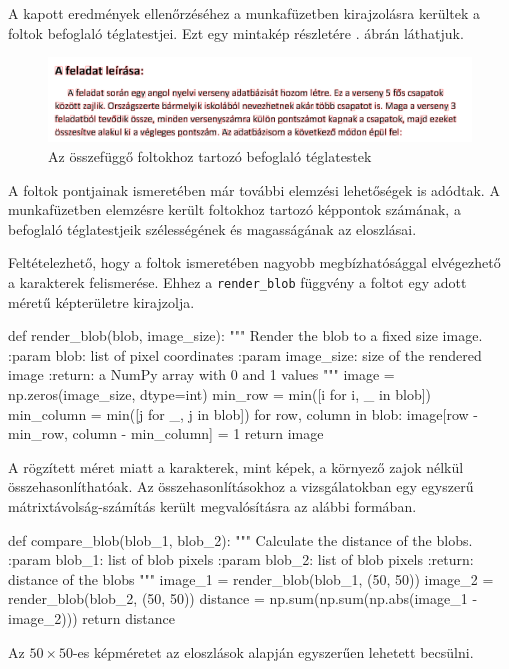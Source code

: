 A kapott eredmények ellenőrzéséhez a munkafüzetben kirajzolásra kerültek a foltok befoglaló téglatestjei. Ezt  egy mintakép részletére . ábrán láthatjuk.

\begin{figure}[h!]
\centering
\includegraphics[width=\textwidth]{images/bounded_boxes.png}
\caption{Az összefüggő foltokhoz tartozó befoglaló téglatestek}
\label{fig:bounded_boxes}
\end{figure}

A foltok pontjainak ismeretében már további elemzési lehetőségek is adódtak. A munkafüzetben elemzésre került foltokhoz tartozó képpontok számának, a befoglaló téglatestjeik szélességének és magasságának az eloszlásai.

Feltételezhető, hogy a foltok ismeretében nagyobb megbízhatósággal elvégezhető a karakterek felismerése.
Ehhez a \texttt{render\_blob} függvény a foltot egy adott méretű képterületre kirajzolja.
\begin{python}
def render_blob(blob, image_size):
    """
    Render the blob to a fixed size image.
    :param blob: list of pixel coordinates
    :param image_size: size of the rendered image
    :return: a NumPy array with 0 and 1 values
    """
    image = np.zeros(image_size, dtype=int)
    min_row = min([i for i, _ in blob])
    min_column = min([j for _, j in blob])
    for row, column in blob:
        image[row - min_row, column - min_column] = 1
    return image
\end{python}
A rögzített méret miatt a karakterek, mint képek, a környező zajok nélkül összehasonlíthatóak.
Az összehasonlításokhoz a vizsgálatokban egy egyszerű mátrixtávolság-számítás került megvalósításra az alábbi formában.
\begin{python}
def compare_blob(blob_1, blob_2):
    """
    Calculate the distance of the blobs.
    :param blob_1: list of blob pixels
    :param blob_2: list of blob pixels
    :return: distance of the blobs
    """
    image_1 = render_blob(blob_1, (50, 50))
    image_2 = render_blob(blob_2, (50, 50))
    distance = np.sum(np.sum(np.abs(image_1 - image_2)))
    return distance
\end{python}
Az $50\times50$-es képméretet az eloszlások alapján egyszerűen lehetett becsülni.

